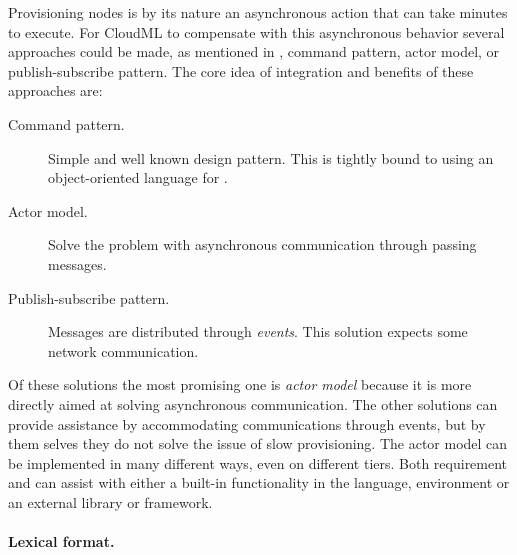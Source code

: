 Provisioning nodes is by its nature an asynchronous action that can take minutes to execute.
For CloudML to compensate with this asynchronous behavior several approaches could be made,
as mentioned in , \eg command pattern, actor model,
or publish-subscribe pattern.
The core idea of integration and benefits of these approaches are:
\begin{description}
  \item[Command pattern.] Simple and well known design pattern. 
    This is tightly bound to using an object-oriented language for .
  \item[Actor model.] Solve the problem with asynchronous communication through passing messages.
  \item[Publish-subscribe pattern.] Messages are distributed through \emph{events}.
    This solution expects some network communication.
\end{description}
Of these solutions the most promising one is \emph{actor model} because it is more directly aimed
at solving asynchronous communication.
The other solutions can provide assistance by accommodating communications through events, 
but by them selves they do not solve the issue of slow provisioning.
The actor model can be implemented in many different ways, even on different tiers.
Both requirement  and  can assist with either
a built-in functionality in the language, environment or an external library or framework.

\paragraph{Lexical format.}

